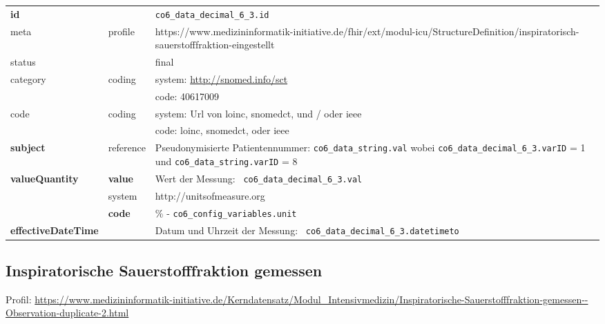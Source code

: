 \begin{longtable}{|l|l|p{7.5cm}|}
	\hline
	\rowcolor{lightgray} \multicolumn{3}{|l|}{Data Mapping (inhaltlich)} \\ \hline
	\textbf{id} &  & \texttt{co6\_data\_decimal\_6\_3.id} \\ \hline
	meta & profile & https://www.medizininformatik-initiative.de/fhir/ext/modul-icu/StructureDefinition/inspiratorisch-sauerstofffraktion-eingestellt \\ \hline 
	status &  & final   \\ \hline 
	category & coding & system: \url{http://snomed.info/sct} \\
	\cline{3-3}
	& & code: 40617009 \\ \hline
	code & coding & system: Url von \ac{loinc}, \ac{snomedct}, und / oder \ac{ieee} \\ 
	\cline{3-3} 
	&  & code: \ac{loinc}, \ac{snomedct}, oder \ac{ieee} \\ \hline
	\textbf{subject} & reference & Pseudonymisierte Patientennummer: \texttt{co6\_data\_string.val} wobei \texttt{co6\_data\_decimal\_6\_3.varID} = 1 und \texttt{co6\_data\_string.varID} = 8 \\ \hline
	\textbf{valueQuantity}  & \textbf{value} & Wert der Messung: \texttt{
		co6\_data\_decimal\_6\_3.val} \\
	\cline{2-3}
	& system & http://unitsofmeasure.org \\
	\cline{2-3}
	& \textbf{code} & \% - \texttt{co6\_config\_variables.unit}
	\\ \hline
	\textbf{effectiveDateTime}  & & Datum und Uhrzeit der Messung: \texttt{
		co6\_data\_decimal\_6\_3.datetimeto} \\
	\hline
\end{longtable}

\subsection{Inspiratorische Sauerstofffraktion gemessen} 

Profil: \url{https://www.medizininformatik-initiative.de/Kerndatensatz/Modul_Intensivmedizin/Inspiratorische-Sauerstofffraktion-gemessen--Observation-duplicate-2.html}

